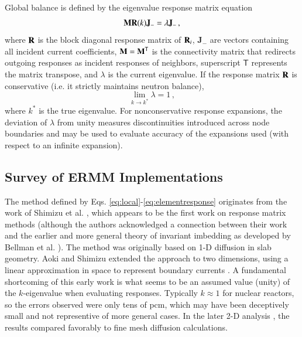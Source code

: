 Global balance is defined by the eigenvalue response matrix
equation
\begin{equation}
  \mathbf{M}\mathbf{R}(k)\mathbf{J_-}  = \lambda \mathbf{J_-} \, ,
  \label{eq:erme}
\end{equation}
where 
$\mathbf{R}$ is the block diagonal response matrix of $\mathbf{R}_i$,  
$\mathbf{J}_{-}$ are vectors containing all incident current coefficients, 
$\mathbf{M}=\mathbf{M}^\mathsf{T}$ is 
the connectivity matrix that redirects outgoing responses as incident
responses of neighbors, superscript $\mathsf{T}$ represents the matrix 
transpose, and $\lambda$ is the current eigenvalue.  
If the response matrix $\mathbf{R}$ is conservative (i.e. it
strictly maintains neutron balance),
\begin{equation}
 \lim_{k\to k^*} \lambda = 1 \, ,
\end{equation}
where $k^*$ is the true eigenvalue.
For nonconservative response expansions, the deviation of $\lambda$ from
unity measures discontinuities introduced across node boundaries and 
may be used to evaluate accuracy of the expansions used (with 
respect to an infinite expansion).


\subsection{Survey of ERMM Implementations}

The method defined by Eqs. \ref{eq:local}-\ref{eq:elementresponse}
originates from the work of Shimizu et al. 
\cite{shimizu1963rmm, shimizu1963arm}, which appears to be the first work 
on response matrix methods (although the authors acknowledged a 
connection between their work and the earlier and more general 
theory of invariant imbedding as developed by Bellman et al. 
\cite{bellman1960iim}).  The method was originally based on 1-D diffusion 
in slab geometry. Aoki and Shimizu extended the approach to two dimensions, 
using a linear approximation in space to represent boundary
currents \cite{aoki1965arm}.
A fundamental shortcoming of this early work is what seems to
be an assumed value (unity) of the $k$-eigenvalue when evaluating responses.
Typically $k \approx 1$ for nuclear reactors, so the errors observed 
were only tens of pcm, which may have been deceptively small
and not representive of more general cases.
In the later 2-D analysis \cite{aoki1965arm}, the results compared 
favorably to fine mesh diffusion calculations.

